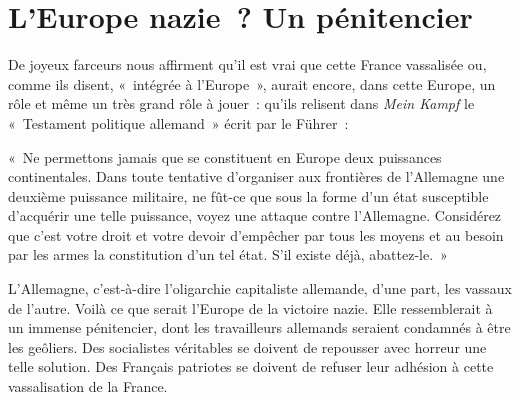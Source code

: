 \documentclass[french,twoside]{book} %
\newenvironment{quoteblock}%
  {\begin{quoting}}
  {\end{quoting}}
\newenvironment{quotebar}{%
    \def\FrameCommand{{\color{rubric!10!}\vrule width 0.5em} \hspace{0.9em}}%
    \def\OuterFrameSep{\itemsep} %
    \MakeFramed {\advance\hsize-\width \FrameRestore}
  }%
  {%
    \endMakeFramed
  }
\renewenvironment{quoteblock}%
  {%
    \savenotes
    \setstretch{0.9}
    \normalfont
    \begin{quotebar}
  }
  {%
    \end{quotebar}
    \spewnotes
  }
\begin{document}
\section[L’Europe nazie ? Un pénitencier]{L’Europe nazie ? Un pénitencier}
\noindent De joyeux farceurs nous affirment qu’il est vrai que cette France vassalisée ou, comme ils disent, « intégrée à l’Europe », aurait encore, dans cette Europe, un rôle et même un très grand rôle à jouer : qu’ils relisent dans \emph{Mein Kampf} le « Testament politique allemand » écrit par le Führer :\par

\begin{quoteblock}
 \noindent « Ne permettons jamais que se constituent en Europe deux puissances continentales. Dans toute tentative d’organiser aux frontières de l’Allemagne une deuxième puissance militaire, ne fût-ce que sous la forme d’un état susceptible d’acquérir une telle puissance, voyez une attaque contre l’Allemagne. Considérez que c’est votre droit et votre devoir d’empêcher par tous les moyens et au besoin par les armes la constitution d’un tel état. S’il existe déjà, abattez-le. »
 \end{quoteblock}

\noindent L’Allemagne, c’est-à-dire l’oligarchie capitaliste allemande, d’une part, les vassaux de l’autre. Voilà ce que serait l’Europe de la victoire nazie. Elle ressemblerait à un immense pénitencier, dont les travailleurs allemands seraient condamnés à être les geôliers. Des socialistes véritables se doivent de repousser avec horreur une telle solution. Des Français patriotes se doivent de refuser leur adhésion à cette vassalisation de la France.
\end{document}
